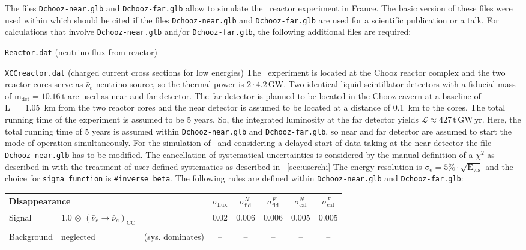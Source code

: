 \begin{appendix}
The files {\tt Dchooz-near.glb} and {\tt Dchooz-far.glb} allow to simulate the \DC\ reactor experiment in France. 
The basic version of these files were used within \cite{Huber:2006vr} which should be cited if the files 
{\tt Dchooz-near.glb} and {\tt Dchooz-far.glb} are
used for a scientific publication or a talk. For calculations that involve {\tt Dchooz-near.glb} and/or {\tt Dchooz-far.glb}, the following
additional files are required:
\bi
\item {\tt Reactor.dat} (neutrino flux from reactor)
\item {\tt XCCreactor.dat} (charged current cross sections for low energies)
\ei
The \DC\ experiment is located at the Chooz reactor complex and the two reactor cores serve as $\bar{\nu}_e$
neutrino source, so the thermal power is $\mathrm{2\cdot4.2\,GW}$. Two identical liquid scintillator detectors
with a fiducial mass of $\mathrm{m_{det} = 10.16 \,t}$ are used as near and far detector. The far detector
is planned to be located in the {\sc Chooz} cavern at a baseline of L~=~1.05~km from the two reactor cores and
the near detector is assumed to be located at a distance of 0.1~km to the cores. The total running time of the
experiment is assumed to be 5 years. So, the integrated luminosity at the far detector yields $\mathrm{\mathcal{L} \approx
427 \,t \, GW\, yr}$.
Here, the total running time of 5 years is assumed within {\tt Dchooz-near.glb} and {\tt Dchooz-far.glb}, so near
and far detector are assumed to start the mode of operation simultaneously. For the simulation of \DC\ and
considering a delayed start of data taking at the near detector the file {\tt Dchooz-near.glb} has to be
modified. The cancellation of systematical uncertainties is considered by the manual definition of a $\chi^2$
as described in \cite{Huber:2006vr} with the treatment of user-defined systematics as described in \Sec~\ref{sec:userchi}   
The energy resolution is
$\mathrm{\sigma_e=5\%\cdot\sqrt{E_{vis}}}$ and the choice for {\tt sigma\_function} is {\tt \#inverse\_beta}. The following rules are defined within {\tt Dchooz-near.glb} and {\tt Dchooz-far.glb}: 
\begin{center}
\begin{tabular}{|l|ll|c|c|c|c|c|}
\hline \hline
\multicolumn{3}{|l|}{Disappearance} & $\sigma_\mathrm{flux}$ & $\sigma^N_\mathrm{fid}$ & $\sigma^F_\mathrm{fid}$ &
$\sigma^N_\mathrm{cal}$ & $\sigma^F_\mathrm{cal}$ \\ \hline 
Signal & $1.0 \, \otimes \, (\bar{\nu}_e\rightarrow\bar{\nu}_e)_{\mathrm{CC}}$ & & 0.02 & 0.006 & 0.006 & 0.005 &
0.005 \\
 & & & & & & & \\
Background & neglected & (sys. dominates) & -- & -- & -- & -- & -- \\ \hline \hline 
\end{tabular}
\end{center}


\end{appendix}
